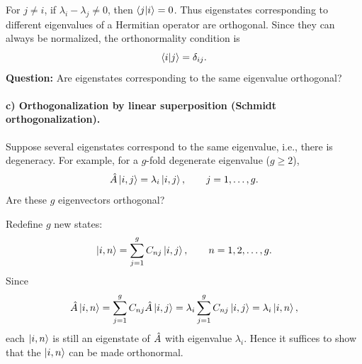 For $j\ne i$, if $\lambda_i-\lambda_j\ne0$, then $\left\langle j\middle|i\right\rangle=0$. Thus eigenstates corresponding to different eigenvalues of a Hermitian operator are orthogonal. Since they can always be normalized, the orthonormality condition is
\begin{equation}
\left\langle i\middle|j\right\rangle=\delta_{ij}.
\end{equation}
\textbf{Question:} Are eigenstates corresponding to the same eigenvalue orthogonal?
\paragraph{c) Orthogonalization by linear superposition (Schmidt orthogonalization).}
Suppose several eigenstates correspond to the same eigenvalue, i.e., there is degeneracy. For example, for a $g$-fold degenerate eigenvalue ($g\ge2$),
\begin{equation}
\hat{A}\left|i,j\right\rangle=\lambda_i\left|i,j\right\rangle,\qquad j=1,\ldots,g.
\end{equation}
Are these $g$ eigenvectors orthogonal?

Redefine $g$ new states:
\begin{equation}
\left|i,n\right\rangle=\sum_{j=1}^g C_{nj}\left|i,j\right\rangle,\qquad n=1,2,\ldots,g.
\end{equation}
Since
\begin{equation}
\hat{A}\left|i,n\right\rangle=\sum_{j=1}^g C_{nj}\hat{A}\left|i,j\right\rangle
=\lambda_i\sum_{j=1}^g C_{nj}\left|i,j\right\rangle=\lambda_i\left|i,n\right\rangle,
\end{equation}
each $\left|i,n\right\rangle$ is still an eigenstate of $\hat{A}$ with eigenvalue $\lambda_i$. Hence it suffices to show that the $\left|i,n\right\rangle$ can be made orthonormal.


